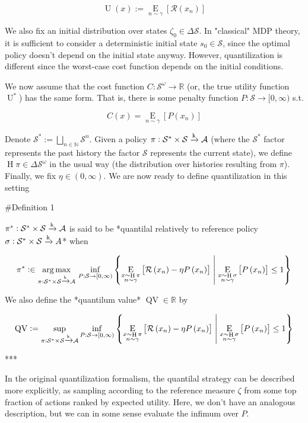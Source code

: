 \documentclass[a4paper]{article}
\newcommand{\AP}[1]{\left(#1\right)}
\newcommand{\AB}[1]{\left[#1\right]}
\newcommand{\ACM}[2]{\left\{#1\;\middle\vert\;#2\right\}}
\newcommand{\Ea}[2]{\underset{#1}{\operatorname{E}}\AB{#2}}
\newcommand{\Argmax}[1]{\underset{#1}{\operatorname{arg\,max}}\,}
\newcommand{\Nats}{\mathbb{N}}
\newcommand{\Reals}{\mathbb{R}}
\newcommand{\K}{\xrightarrow{\textnormal{k}}}
\newcommand{\A}{\mathcal{A}}
\newcommand{\St}{\mathcal{S}}
\newcommand{\R}{\mathcal{R}}
\newcommand{\Pe}{P}
\newcommand{\Ut}{\operatorname{U}}
\newcommand{\Co}{C}
\newcommand{\QV}{\operatorname{QV}}
\DeclareMathOperator{\Hi}{H}
\begin{document}
$$\Ut(x):=\Ea{n\sim\gamma}{\R\AP{x_n}}$$

We also fix an initial distribution over states $\zeta_0 \in \Delta \St$. In "classical" MDP theory, it is sufficient to consider a deterministic initial state $s_0 \in \St$, since the optimal policy doesn't depend on the initial state anyway. However, quantilization is different since the worst-case cost function depends on the initial conditions.

We now assume that the cost function $\Co: \St^\omega \rightarrow \Reals$ (or, the true utility function $\Ut^*$) has the same form. That is, there is some penalty function $\Pe: \St \rightarrow [0,\infty)$ s.t.

$$\Co(x) = \Ea{n\sim\gamma}{\Pe\AP{x_n}}$$

Denote $\St^*:=\bigsqcup_{n\in\Nats}\St^n$. Given a policy $\pi: \St^*\times\St \K \A$ (where the $\St^*$ factor represents the past history the factor $\St$ represents the current state), we define $\Hi{\pi} \in \Delta\St^\omega$ in the usual way (the distribution over histories resulting from $\pi$). Finally, we fix $\eta \in (0,\infty)$. We are now ready to define quantilization in this setting

\#Definition 1

$\pi^* : \St^*\times\St \K \A$ is said to be *quantilal relatively to reference policy $\sigma: \St^*\times\St \K A$* when

$$\pi^* :\in \Argmax{\pi: \St^*\times\St \K \A}\inf_{\Pe:\St\rightarrow[0,\infty)}\ACM{\Ea{\substack{x\sim\Hi{\pi}\\n\sim\gamma}}{\R\AP{x_n}-\eta\Pe\AP{x_n}}}{\Ea{\substack{x\sim\Hi{\sigma}\\n\sim\gamma}}{\Pe\AP{x_n}}\leq1}$$

We also define the *quantilum value* $\QV \in \Reals$ by

$$\QV := \sup_{\pi: \St^*\times\St \K \A}\inf_{\Pe:\St\rightarrow[0,\infty)}\ACM{\Ea{\substack{x\sim\Hi{\pi}\\n\sim\gamma}}{\R\AP{x_n}-\eta\Pe\AP{x_n}}}{\Ea{\substack{x\sim\Hi{\sigma}\\n\sim\gamma}}{\Pe\AP{x_n}}\leq1}$$

***

In the original quantilization formalism, the quantilal strategy can be described more explicitly, as sampling according to the reference measure $\zeta$ from some top fraction of actions ranked by expected utility. Here, we don't have an analogous description, but we can in some sense evaluate the infimum over $\Pe$.
\end{document}
